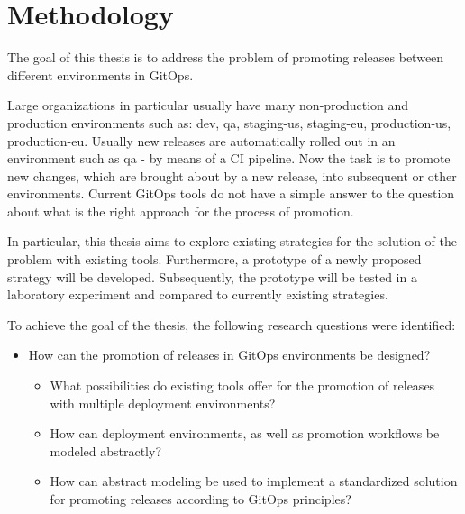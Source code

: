 \chapter{Methodology}

The goal of this thesis is to
address the problem of promoting releases between different environments in GitOps.
\bigskip

\noindent
Large organizations in particular usually have many
non-production and production environments
such as: dev, qa, staging-us, staging-eu, production-us, production-eu.
Usually new releases are automatically rolled out in an environment
such as qa - by means of a CI pipeline.
Now the task is to promote
new changes, which are brought about by a new release,
into subsequent or other environments.
Current GitOps tools do not have a simple answer to
the question about what is the right approach for the process of promotion.
\bigskip

\noindent
In particular, this thesis aims to explore
existing strategies for the solution of the problem
with existing tools.
Furthermore, a prototype of a newly proposed strategy will be developed.
Subsequently, the prototype will be tested in a laboratory experiment
and compared to currently existing strategies.
\bigskip



\noindent
To achieve the goal of the thesis, the following research questions were identified:

\begin{itemize}
	\item How can the promotion of releases in GitOps environments be designed?
	\begin{itemize}
		\item What possibilities do existing tools offer for the promotion of releases with multiple deployment environments?
		\item How can deployment environments, as well as promotion workflows be modeled abstractly?
		\item How can abstract modeling be used to implement a standardized solution for promoting releases according to GitOps principles?
	\end{itemize}
\end{itemize}

